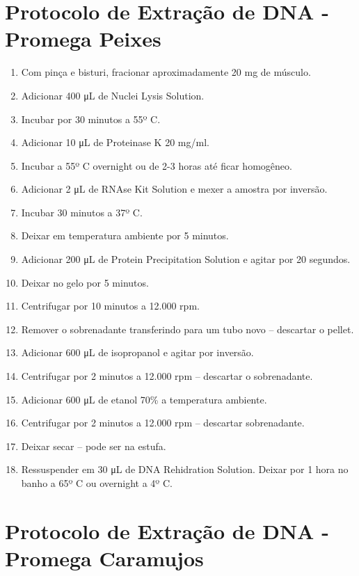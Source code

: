 \documentclass[
  letterpaper,
  DIV=11,
  numbers=noendperiod]{scrreprt}
\begin{document}
\hypertarget{protocolo-de-extrauxe7uxe3o-de-dna---promega-peixes}{%
\section{\texorpdfstring{Protocolo de Extração de DNA - Promega
\textbf{Peixes}}{Protocolo de Extração de DNA - Promega Peixes}}\label{protocolo-de-extrauxe7uxe3o-de-dna---promega-peixes}}

\begin{enumerate}
\def\labelenumi{\arabic{enumi}.}
\item
  Com pinça e bisturi, fracionar aproximadamente 20 mg de músculo.
\item
  Adicionar 400 μL de Nuclei Lysis Solution.
\item
  Incubar por 30 minutos a 55º C.
\item
  Adicionar 10 μL de Proteinase K 20 mg/ml.
\item
  Incubar a 55º C overnight ou de 2-3 horas até ficar homogêneo.
\item
  Adicionar 2 μL de RNAse Kit Solution e mexer a amostra por inversão.
\item
  Incubar 30 minutos a 37º C.
\item
  Deixar em temperatura ambiente por 5 minutos.
\item
  Adicionar 200 μL de Protein Precipitation Solution e agitar por 20
  segundos.
\item
  Deixar no gelo por 5 minutos.
\item
  Centrifugar por 10 minutos a 12.000 rpm.
\item
  Remover o sobrenadante transferindo para um tubo novo -- descartar o
  pellet.
\item
  Adicionar 600 μL de isopropanol e agitar por inversão.
\item
  Centrifugar por 2 minutos a 12.000 rpm -- descartar o sobrenadante.
\item
  Adicionar 600 μL de etanol 70\% a temperatura ambiente.
\item
  Centrifugar por 2 minutos a 12.000 rpm -- descartar sobrenadante.
\item
  Deixar secar -- pode ser na estufa.
\item
  Ressuspender em 30 μL de DNA Rehidration Solution. Deixar por 1 hora
  no banho a 65º C ou overnight a 4º C.
\end{enumerate}

\hypertarget{protocolo-de-extrauxe7uxe3o-de-dna---promega-caramujos}{%
\section{\texorpdfstring{Protocolo de Extração de DNA - Promega
\textbf{Caramujos}}{Protocolo de Extração de DNA - Promega Caramujos}}\label{protocolo-de-extrauxe7uxe3o-de-dna---promega-caramujos}}
\end{document}
